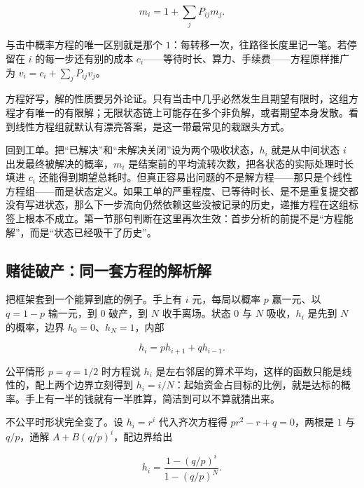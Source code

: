 \[
m_i=1+\sum_j P_{ij}m_j.
\]

与击中概率方程的唯一区别就是那个 \(1\)：每转移一次，往路径长度里记一笔。若停留在 \(i\) 的每一步还有别的成本 \(c_i\)——等待时长、算力、手续费——方程原样推广为 \(v_i=c_i+\sum_jP_{ij}v_j\)。

方程好写，解的性质要另外论证。只有当击中几乎必然发生且期望有限时，这组方程才有唯一的有限解；无限状态链上可能存在多个非负解，或者期望本身发散。看到线性方程组就默认有漂亮答案，是这一带最常见的栽跟头方式。

回到工单。把``已解决''和``未解决关闭''设为两个吸收状态，\(h_i\) 就是从中间状态 \(i\) 出发最终被解决的概率，\(m_i\) 是结案前的平均流转次数，把各状态的实际处理时长填进 \(c_i\) 还能得到期望总耗时。但真正容易出问题的不是解方程——那只是个线性方程组——而是状态定义。如果工单的严重程度、已等待时长、是不是重复提交都没有写进状态，那么下一步流向仍然依赖这些没被记录的历史，递推方程在这组标签上根本不成立。第一节那句判断在这里再次生效：首步分析的前提不是``方程能解''，而是``状态已经吸干了历史''。

\subsection{赌徒破产：同一套方程的解析解}

把框架套到一个能算到底的例子。手上有 \(i\) 元，每局以概率 \(p\) 赢一元、以 \(q=1-p\) 输一元，到 \(0\) 破产，到 \(N\) 收手离场。状态 \(0\) 与 \(N\) 吸收，\(h_i\) 是先到 \(N\) 的概率，边界 \(h_0=0\)、\(h_N=1\)，内部

\[
h_i=ph_{i+1}+qh_{i-1}.
\]

公平情形 \(p=q=1/2\) 时方程说 \(h_i\) 是左右邻居的算术平均，这样的函数只能是线性的，配上两个边界立刻得到 \(h_i=i/N\)：起始资金占目标的比例，就是达标的概率。手上有一半的钱就有一半胜算，简洁到可以不算就猜出来。

不公平时形状完全变了。设 \(h_i=r^i\) 代入齐次方程得 \(pr^2-r+q=0\)，两根是 \(1\) 与 \(q/p\)，通解 \(A+B(q/p)^i\)，配边界给出

\[
h_i=\frac{1-(q/p)^i}{1-(q/p)^N}.
\]

